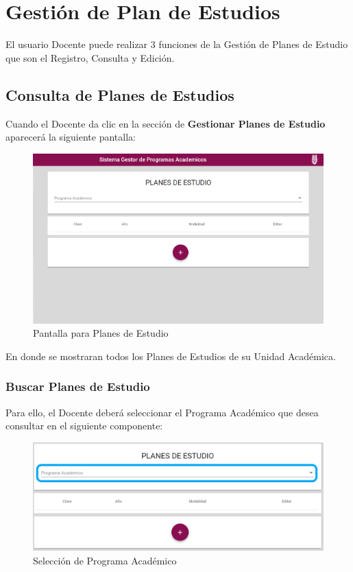 
\chapter{Gestión de Plan de Estudios}
El usuario Docente puede realizar 3 funciones de la Gestión de Planes de Estudio que son el Registro, Consulta y Edición.
\section{Consulta de Planes de Estudios}
Cuando el Docente da clic en la sección de \textbf{Gestionar Planes de Estudio} aparecerá la siguiente pantalla:


\begin{figure}[!hbtp]
	\centering
	\hypertarget{consultarPE}{\includegraphics[width=0.7\linewidth]{images/SP4-GPE/consultar}}
	\caption{Pantalla para Planes de Estudio}
	\label{consultarPE}
\end{figure}

En donde se mostraran todos los Planes de Estudios de su Unidad Académica.
\newpage
\subsection{Buscar Planes de Estudio}

Para ello, el Docente deberá seleccionar el Programa Académico que desea consultar en el siguiente componente:

\begin{figure}[!hbtp]
	\centering
	\hypertarget{academico}{\includegraphics[width=0.7\linewidth]{images/SP4-GPE/programa}}
	\caption{Selección de Programa Académico}
	\label{academico}
\end{figure}

